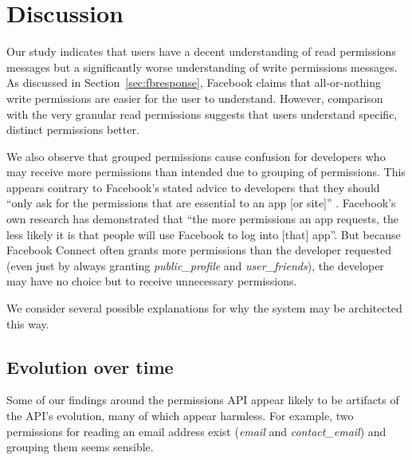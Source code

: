 \documentclass{sig-alternate}
\begin{document}
\section{Discussion}


Our study indicates that users have a decent understanding of read permissions messages but a significantly worse understanding of write permissions messages. As discussed in Section~\ref{sec:fbresponse}, Facebook claims that all-or-nothing write permissions are easier for the user to understand. However, comparison with the very granular read permissions suggests that users understand specific, distinct permissions better.

We also observe that grouped permissions cause confusion for developers who may receive more permissions than intended due to grouping of permissions.
This appears contrary to Facebook's stated advice to developers that they should ``only ask for the permissions that are essential to an app [or site]'' \cite{fbpermsinstructions}. Facebook's own research has demonstrated that ``the more permissions an app requests, the less likely it is that people will use Facebook to log into [that] app''\cite{fbpermsinstructions}.
But because Facebook Connect often grants more permissions than the developer requested (even just by always granting \emph{public\_profile} and \emph{user\_friends}), the developer may have no choice but to receive unnecessary permissions.

We consider several possible explanations for why the system may be architected this way.

\subsection{Evolution over time}

Some of our findings around the permissions API appear likely to be artifacts of the API's evolution, many of which appear harmless.
For example, two permissions for reading an email address exist (\emph{email} and \emph{contact\_email}) and grouping them seems sensible.

\label{sec:investigationdiscussion}
\end{document}
